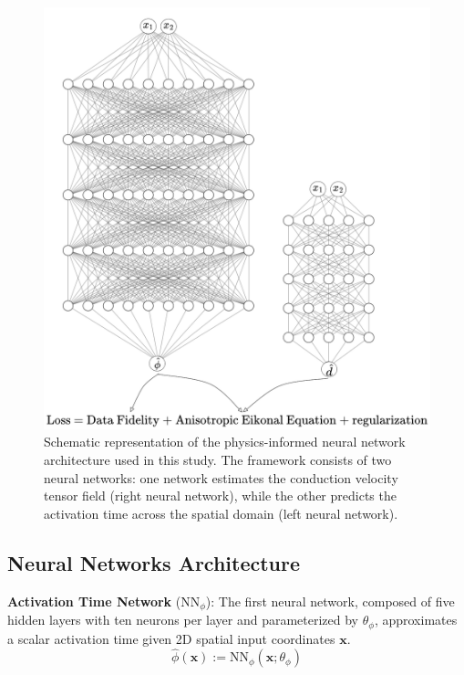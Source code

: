 \begin{figure}
    \centering
    \includegraphics[width=1\linewidth]{figures/NeuralNet.png}
    \caption{
    Schematic representation of the physics-informed neural network architecture used in this study. The framework consists of two neural networks: one network estimates the conduction velocity tensor field (right neural network), while the other predicts the activation time across the spatial domain (left neural network).
    }
    \label{fig:NNArch}
\end{figure}

\subsection{Neural Networks Architecture}


\textbf{Activation Time Network} ($\text{NN}_\phi$): The first neural network, composed of five hidden layers with ten neurons per layer and parameterized by $\theta_\phi$, approximates a scalar activation time given 2D spatial input coordinates $\mathbf{x}$.
\begin{equation}
\hat{\phi}(\mathbf{x}) := \text{NN}_\phi(\mathbf{x}; \theta_\phi)
\end{equation}

